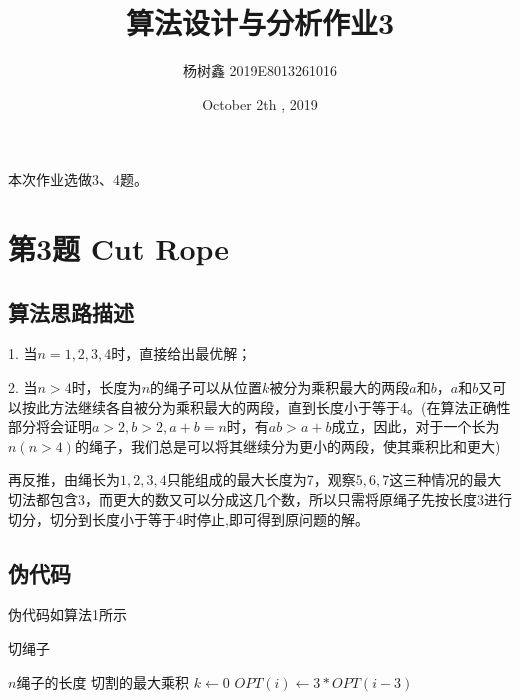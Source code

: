 \documentclass{article}
\title{算法设计与分析作业3}
\author{杨树鑫 2019E8013261016}
\date{October 2th , 2019}
\begin{document}
\maketitle

本次作业选做3、4题。


\section{第3题 Cut Rope}
\subsection{算法思路描述}
\par 1. 当$n=1,2,3,4$时，直接给出最优解；
\par 2. 当$n > 4$时，长度为$n$的绳子可以从位置$k$被分为乘积最大的两段$a$和$b$，$a$和$b$又可以按此方法继续各自被分为乘积最大的两段，直到长度小于等于4。(在算法正确性部分将会证明$a>2, b>2,a+b=n$时，有$ab>a+b$成立，因此，对于一个长为$n(n>4)$的绳子，我们总是可以将其继续分为更小的两段，使其乘积比和更大)
\par 再反推，由绳长为$1,2,3,4$只能组成的最大长度为7，观察$5,6,7$这三种情况的最大切法都包含3，而更大的数又可以分成这几个数，所以只需将原绳子先按长度3进行切分，切分到长度小于等于4时停止,即可得到原问题的解。

\subsection{伪代码}
\par 伪代码如算法1所示

\begin{algorithm}[ht]
    \caption{切绳子}
    \begin{algorithmic}[1] %
        \Require $n$绳子的长度
        \Ensure 切割的最大乘积
            \EndIf
            \EndIf
            \EndIf
            \State $k \gets 0$
                \State $OPT(i) \gets 3*OPT(i-3)$
            \EndFor
            \State {}
        \EndFunction
    \end{algorithmic}
\end{algorithm}
\end{document}
